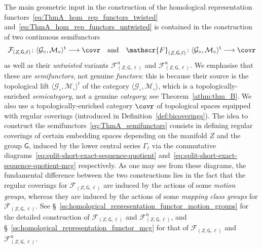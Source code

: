 \documentclass[AHL,Unicode,published]{cedram}
\newcommand{\mt}{\mathrm{t}}
\newcommand{\unt}{\mathrm{u}}
\newcommand{\LCS}{\varGamma}
\newcommand{\sF}{\mathscr{F}}
\newcommand{\sG}{\mathsf{G}}
\newcommand{\cF}{\mathcal{F}}
\newcommand{\cG}{\mathcal{G}}
\newcommand{\cM}{\mathcal{M}}
\newcommand{\too}{\ensuremath{\longrightarrow}}
\begin{document}
The main geometric input in the construction of the homological representation functors~\eqref{eq:ThmA_hom_rep_functors_twisted} and~\eqref{eq:ThmA_hom_rep_functors_untwisted} is contained in the construction of two continuous semifunctors
\begin{equation}\label{eq:ThmA_semifunctors}
\cF_{(Z,\sG,\ell)}\colon \langle \cG_{\circ}, \cM_{\circ} \rangle^{\mt} \too \covr \quad \text{and} \quad \sF_{(Z,\sG,\ell)}\colon \langle \cG_{\circ}, \cM_{\circ} \rangle^{\mt} \too \covr
\end{equation}
as well as their \emph{untwisted} variants $\cF^{\unt}_{(Z,\sG,\ell)}$ and $\sF^{\unt}_{(Z,\sG,\ell)}$. We emphasise that these are \emph{semifunctors}, not genuine \emph{functors}: this is because their source is the topological lift $\langle \cG_{\circ}, \cM_{\circ} \rangle^{\mt}$ of the category $\langle \cG_{\circ}, \cM_{\circ} \rangle$, which is a topologically-enriched \emph{semicategory}, not a genuine \emph{category}; see Theorem~\ref{athm:thm_B}. We also use a topologically-enriched category $\covr$ of topological spaces equipped with regular coverings (introduced in Definition~\ref{def:bicoverings}). The idea to construct the semifunctors~\eqref{eq:ThmA_semifunctors} consists in defining regular coverings of certain embedding spaces depending on the manifold $Z$ and the group $\sG$, induced by the lower central series $\LCS_{\ell}$ via the commutative diagrams~\eqref{eq:split-short-exact-sequence-quotient} and~\eqref{eq:split-short-exact-sequence-quotient-mcg} respectively. As one may see from these diagrams, the fundamental difference between the two constructions lies in the fact that the regular coverings for $\cF_{(Z,\sG,\ell)}$ are induced by the actions of some \emph{motion groups}, whereas they are induced by the actions of some \emph{mapping class groups} for $\sF_{(Z,\sG,\ell)}$. See \S~\ref{ss:homological_representation_functor_motion_groups} for the detailed construction of $\cF_{(Z,\sG,\ell)}$ and $\cF^{\unt}_{(Z,\sG,\ell)}$, and \S~\ref{ss:homological_representation_functor_mcg} for that of $\sF_{(Z,\sG,\ell)}$ and $\sF^{\unt}_{(Z,\sG,\ell)}$.
\end{document}
